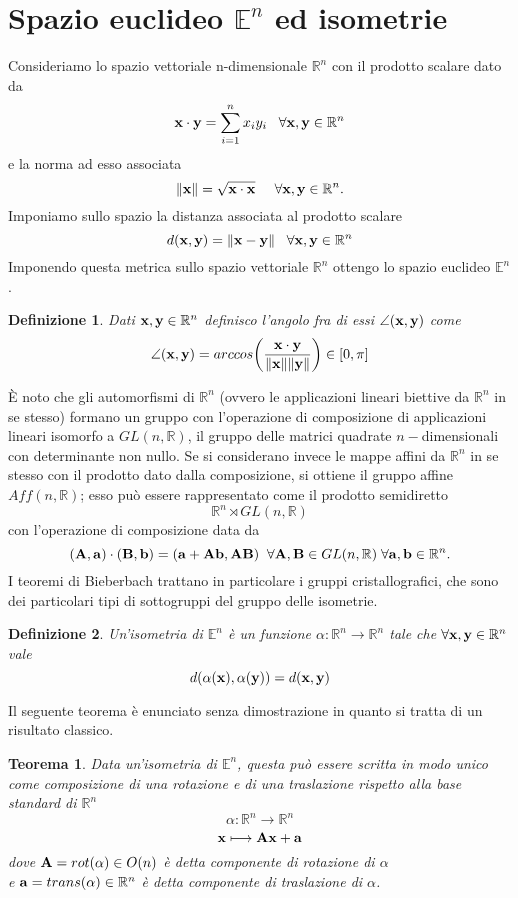 \documentclass[a4paper,11pt,openright,twoside	]{book}
\newtheorem{definition}{Definizione}[section]
\newtheorem{theorem}{Teorema}[section]
\begin{document}
\section{Spazio euclideo $\mathbb{E}^n$ ed isometrie}
Consideriamo lo spazio vettoriale n-dimensionale $\mathbb{R}^{n}$  con il prodotto scalare dato da 
\[
  \vb{x} \cdot \vb{y} =  \sum_{i=1}^{n} x_i y_i    \; \; \; \forall \vb{x} , \vb{y} \in \mathbb{R}^{n}
\]
e la norma ad esso associata              
\[
  \norm{\vb{x}} =  \sqrt{\vb{x} \cdot \vb{x}}     \; \; \; \; \; \forall \vb{x} , \vb{y} \in \mathbb{R}^{n}.
\]
Imponiamo sullo spazio la distanza associata al prodotto scalare 
\[ d(\vb{x}, \vb{y} ) = \norm{\vb{x-y}}           \; \; \; \forall \vb{x} , \vb{y} \in \mathbb{R}^{n}\] 
Imponendo questa metrica sullo spazio vettoriale $\mathbb{R}^n$ ottengo lo spazio euclideo $\mathbb{E}^n$. 
\begin{definition}
Dati $\vb{x, y} \in \mathbb{R}^n$ definisco l'angolo fra di essi $\angle (\vb{x},\vb{y})$ come 
\[ \angle (\vb{x},\vb{y}) = arccos \bigg( \frac{\vb{x} \cdot \vb{y}}{\norm{\vb{x}} \norm{\vb{y}}} \bigg) \in [0, \pi] \]
\end{definition} 
\`E noto che gli automorfismi di $\mathbb{R}^n$ (ovvero le applicazioni lineari biettive da $\mathbb{R}^n$ in se stesso) formano un gruppo con l'operazione di composizione di applicazioni lineari isomorfo a $ GL(n, \mathbb{R}) $, il gruppo delle matrici quadrate $n-$dimensionali con determinante non nullo. 
Se si considerano invece le mappe affini da $\mathbb{R}^n$ in se stesso con il prodotto dato dalla composizione, si ottiene il gruppo affine $Aff(n, \mathbb{R})$; esso può essere rappresentato come il prodotto semidiretto 
\[  \mathbb{R}^{n} \rtimes GL(n, \mathbb{R})   \]
con l'operazione di composizione data da 
\[ (\vb{A, a}) \cdot (\vb{B, b}) = (\vb{ a + Ab, AB})  \; \; \forall \vb{A, B}  \in  GL(n, \mathbb{R}) \; \forall \vb{a, b} \in \mathbb{R}^n. \]
I teoremi di Bieberbach trattano in particolare i gruppi cristallografici, che sono dei particolari tipi di sottogruppi del gruppo delle isometrie.
\begin{definition}
	Un'isometria di $\mathbb{E}^n$  è un funzione $ \alpha : \mathbb{R}^{n} \longrightarrow \mathbb{R}^{n} $  tale che $\forall \vb{x,y} \in \mathbb{R}^n $ vale 
	\[ d(\alpha(\vb{x}), \alpha(\vb{y})) = d(\vb{x} , \vb{y} )\]
\end{definition} Il seguente teorema è enunciato senza dimostrazione in quanto si tratta di un risultato classico. 
\begin{theorem}
Data un'isometria di $\mathbb{E}^n $, questa può essere scritta in modo unico come composizione di una rotazione e di una traslazione rispetto alla base standard di $\mathbb{R}^n$
\[ \alpha : \mathbb{R}^{n} \longrightarrow \mathbb{R}^{n} \]
\[\vb{x} \longmapsto \vb{Ax + a} \]
dove $\vb{A} = rot( \alpha ) \in O(n) $ è detta componente di rotazione di $\alpha$ \\
e $\vb{a} = trans( \alpha ) \in \mathbb{R}^{n} $ è detta componente di traslazione di $\alpha$. 
\end{theorem}
\end{document}
